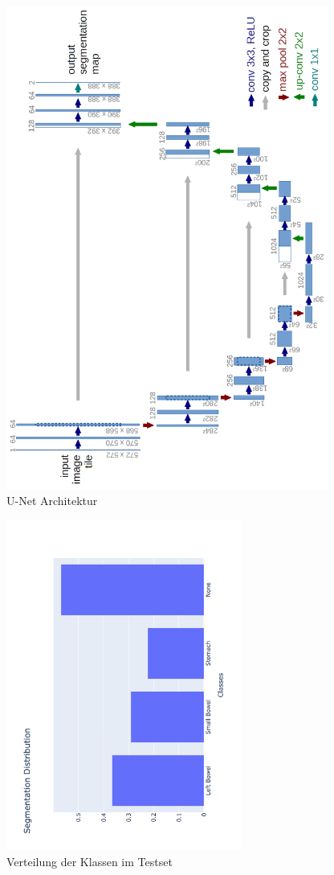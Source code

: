\begin{figure}[htb]
	\begin{center}
		\includegraphics[width=300pt, angle=270]{bilder/u-net-architecture}
		\caption{U-Net Architektur}\label{Fig:unet-diagram}
	\end{center}
\end{figure}

\begin{figure}[htb]
	\begin{center}
		\includegraphics[width=220pt , angle=270]{bilder/segmentation_distribution}
		\caption{Verteilung der Klassen im Testset}\label{Fig:klassenverteilung}
	\end{center}
\end{figure}


